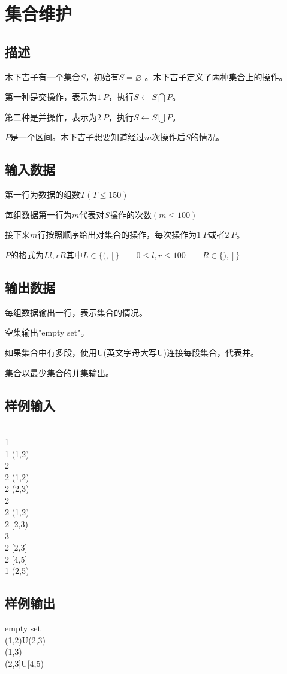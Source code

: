 \ifx\allfiles\undefined

\fi


\section{集合维护}
\subsection*{描述}
木下吉子有一个集合$S$，初始有$S=\varnothing$ 。木下吉子定义了两种集合上的操作。

第一种是交操作，表示为$1\ P$，执行$S\leftarrow S\bigcap P$。

第二种是并操作，表示为$2\ P$，执行$S\leftarrow  S\bigcup P$。

$P$是一个区间。木下吉子想要知道经过$m$次操作后$S$的情况。

\subsection*{输入数据}
第一行为数据的组数$T(T\leqslant 150)$

每组数据第一行为$m$代表对$S$操作的次数$(m\leqslant 100)$

接下来$m$行按照顺序给出对集合的操作，每次操作为$1\ P$或者$2\ P$。

$P$的格式为$Ll,rR$其中$L\in\big\{(,[\big\} \qquad 
0\leqslant l,r \leqslant 100 \qquad 
R\in\big\{),]\big\}$ 

\subsection*{输出数据}
每组数据输出一行，表示集合的情况。

空集输出"empty set"。

如果集合中有多段，使用U(英文字母大写U)连接每段集合，代表并。

集合以最少集合的并集输出。

\subsection*{样例输入}
\\
1\\
1 (1,2)\\
2\\
2 (1,2)\\
2 (2,3)\\
2\\
2 (1,2)\\
2 [2,3)\\
3\\
2 [2,3]\\
2 [4,5]\\
1 (2,5)

\subsection*{样例输出}
\noindent empty set\\
(1,2)U(2,3)\\
(1,3)\\
(2,3]U[4,5)



\ifx\allfiles\undefined

\fi